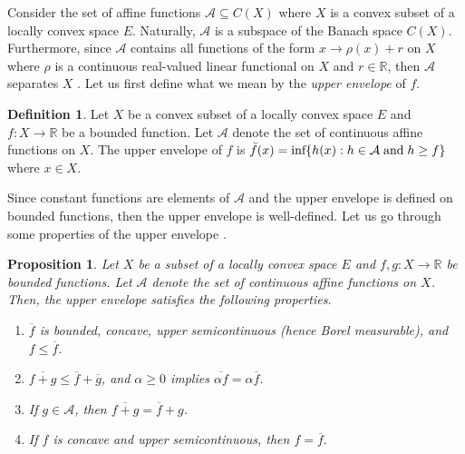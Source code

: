 \documentclass[12pt,a4paper]{amsart}
\newtheorem{proposition}[theorem]{Proposition}
\theoremstyle{definition}
\newtheorem{definition}[theorem]{Definition}
\begin{document}
	Consider the set of affine functions $\mathcal{A} \subseteq C(X)$ where $X$ is a convex subset of a locally convex space $E$. Naturally, $\mathcal{A}$ is a subspace of the Banach space $C(X)$. Furthermore, since $\mathcal{A}$ contains all functions of the form $x \rightarrow \rho(x)+ r$ on $X$ where $\rho$ is a continuous real-valued linear functional on $X$ and $r \in \mathbb{R}$, then $\mathcal{A}$ separates $X$ \cite[Corollary 1.2.12]{kadison-vol-1}. Let us first define what we mean by the \emph{upper envelope} of $f$.
	\begin{definition}
		 Let $X$ be a convex subset of a locally convex space $E$ and $f: X \rightarrow \mathbb{R}$ be a bounded function. Let $\mathcal{A}$ denote the set of continuous affine functions on $X$. The upper envelope of $f$ is $\bar{f}(x) = \textnormal{inf} \lbrace h(x) : h \in \mathcal{A} \; \textnormal{and} \; h \geq f \rbrace$ where $x \in X$.
	\end{definition}
	
	Since constant functions are elements of $\mathcal{A}$ and the upper envelope is defined on bounded functions, then the upper envelope is well-defined. Let us go through some properties of the upper envelope \cite[Page 13]{phelps}.
	\begin{proposition}\label{upper-envelope-properties}
		Let $X$ be a subset of a locally convex space $E$ and $f, g : X \rightarrow \mathbb{R}$ be bounded functions.  Let $\mathcal{A}$ denote the set of continuous affine functions on $X$. Then, the upper envelope satisfies the following properties.
		\begin{enumerate}[label=\textnormal{(\Roman*)}]
			\item $\overline{f}$ is bounded, concave, upper semicontinuous \textnormal{(}hence Borel measurable\textnormal{)}, and $f \leq \overline{f}$.
			\item $\overline{f + g} \leq \overline{f} + \overline{g}$, and $\alpha \geq 0$ implies $\overline{\alpha f} = \alpha \overline{f}$.
			\item If $g \in \mathcal{A}$, then $\overline{f + g} = \overline{f} + g$.
			\item If $f$ is concave and upper semicontinuous, then $f=\overline{f}.$
		\end{enumerate}
	\end{proposition}
	
\end{document}
